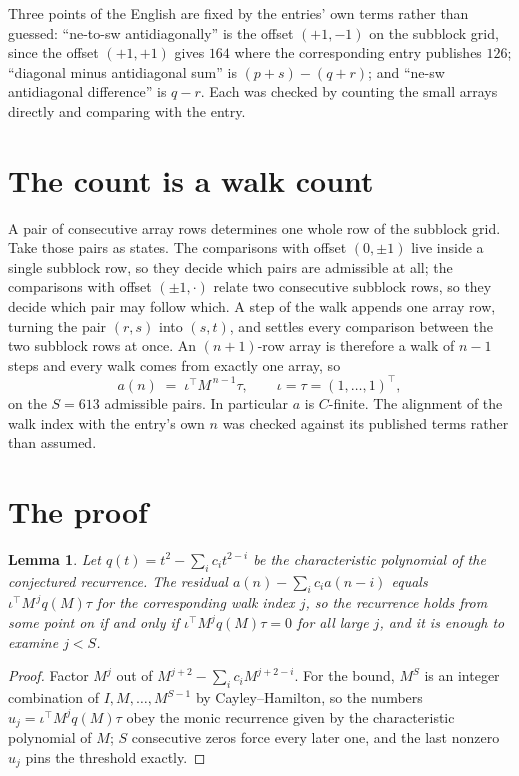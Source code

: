 \documentclass[11pt,a4paper]{article}
\theoremstyle{plain}
\newtheorem{lemma}[theorem]{Lemma}
\theoremstyle{definition}
\begin{document}
Three points of the English are fixed by the entries' own terms rather than guessed:
``ne-to-sw antidiagonally'' is the offset $(+1,-1)$ on the subblock grid, since the offset
$(+1,+1)$ gives $164$ where the corresponding entry publishes $126$; ``diagonal minus
antidiagonal sum'' is $(p+s)-(q+r)$; and ``ne-sw antidiagonal difference'' is $q-r$. Each was
checked by counting the small arrays directly and comparing with the entry.

\section{The count is a walk count}

A pair of consecutive array rows determines one whole row of the subblock grid. Take those
pairs as states. The comparisons with offset $(0,\pm1)$ live inside a single subblock row, so
they decide which pairs are admissible at all; the comparisons with offset $(\pm1,\cdot)$
relate two consecutive subblock rows, so they decide which pair may follow which. A step of the
walk appends one array row, turning the pair $(r,s)$ into $(s,t)$, and settles every comparison
between the two subblock rows at once. An $(n+1)$-row array is therefore a walk of $n-1$ steps
and every walk comes from exactly one array, so
\[
a(n)\;=\;\iota^{\!\top}M^{\,n-1}\tau,\qquad \iota=\tau=(1,\dots,1)^{\!\top},
\]
on the $S=613$ admissible pairs. In particular $a$ is $C$-finite. The alignment of the walk
index with the entry's own $n$ was checked against its published terms rather than assumed.

\section{The proof}

\begin{lemma}\label{lem:crit}
Let $q(t)=t^{2}-\sum_i c_it^{2-i}$ be the characteristic polynomial of the
conjectured recurrence. The residual $a(n)-\sum_ic_ia(n-i)$ equals
$\iota^{\!\top}M^{\,j}q(M)\tau$ for the corresponding walk index $j$, so the recurrence
holds from some point on if and only if $\iota^{\!\top}M^{j}q(M)\tau=0$ for all large $j$,
and it is enough to examine $j<S$.
\end{lemma}

\begin{proof}
Factor $M^{j}$ out of $M^{j+2}-\sum_ic_iM^{j+2-i}$. For the bound, $M^{S}$
is an integer combination of $I,M,\dots,M^{S-1}$ by Cayley--Hamilton, so the numbers
$u_j=\iota^{\!\top}M^{j}q(M)\tau$ obey the monic recurrence given by the characteristic
polynomial of $M$; $S$ consecutive zeros force every later one, and the last nonzero $u_j$
pins the threshold exactly.
\end{proof}
\end{document}
